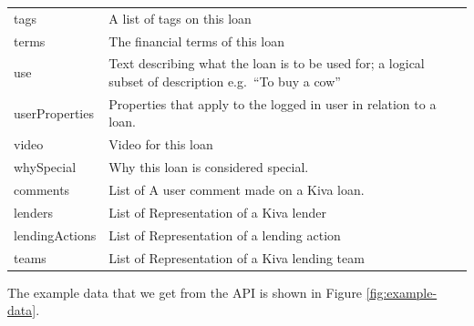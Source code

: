 \begin{longtable}{|p{}|p{}|}
    tags                                 & A list of tags on this loan                                       \\
    terms                                & The financial terms of this loan                                  \\
    use                                  & Text describing what the loan is to be used for; a logical subset
    of description e.g.~``To buy a cow''                                                                     \\
    userProperties                       & Properties that apply to the logged in user in relation
    to a loan.                                                                                               \\
    video                                & Video for this loan                                               \\
    whySpecial                           & Why this loan is considered special.                              \\
    comments                             & List of A user comment made on a Kiva loan.                       \\
    lenders                              & List of Representation of a Kiva lender                           \\
    lendingActions                       & List of Representation of a lending action                        \\
    teams                                & List of Representation of a Kiva lending team                     \\
\end{longtable}

The example data that we get from the API is shown in Figure \ref{fig:example-data}.

